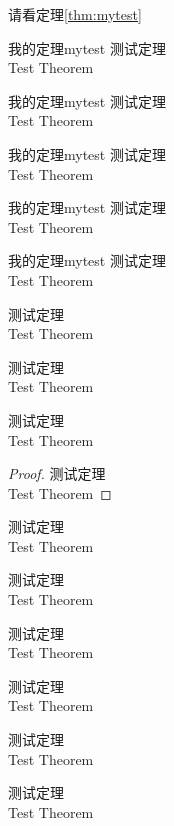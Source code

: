 \documentclass[cn]{../../styles/book/elegantbook/elegantbook}
\begin{document}
请看定理\ref{thm:mytest}

\begin{theorem}{我的定理}{mytest}
测试定理 \\
Test Theorem
\end{theorem}

\begin{definition}{我的定理}{mytest}
测试定理 \\
Test Theorem
\end{definition}

\begin{lemma}{我的定理}{mytest}
测试定理 \\
Test Theorem
\end{lemma}

\begin{corollary}{我的定理}{mytest}
测试定理 \\
Test Theorem
\end{corollary}

\begin{proposition}{我的定理}{mytest}
测试定理 \\
Test Theorem
\end{proposition}

\begin{example}
测试定理 \\
Test Theorem
\end{example}

\begin{exercise}
测试定理 \\
Test Theorem
\end{exercise}

\begin{problem}
测试定理 \\
Test Theorem
\end{problem}

\begin{proof}
测试定理 \\
Test Theorem
\end{proof}

\begin{note}
测试定理 \\
Test Theorem
\end{note}

\begin{conclusion}
测试定理 \\
Test Theorem
\end{conclusion}


\begin{assumption}
测试定理 \\
Test Theorem
\end{assumption}

\begin{property}
测试定理 \\
Test Theorem
\end{property}

\begin{remark}
测试定理 \\
Test Theorem
\end{remark}

\begin{solution}
测试定理 \\
Test Theorem
\end{solution}
\end{document}
